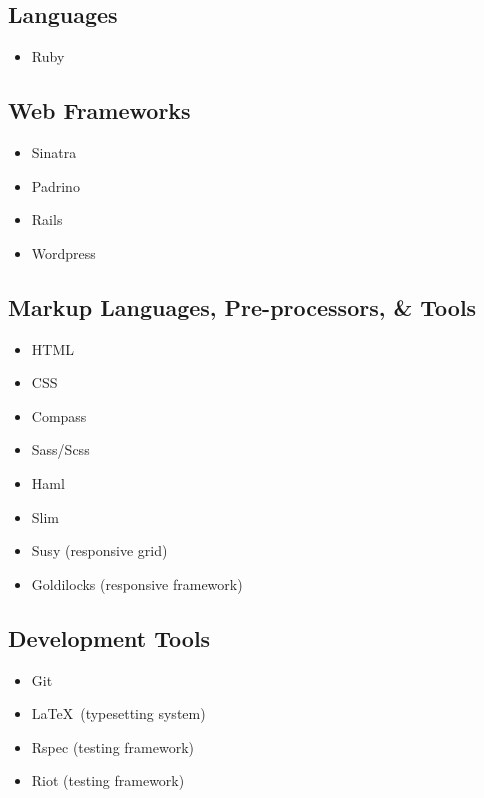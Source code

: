 \documentclass{article}
\begin{document}
\begin{multicols}{2}
\subsection{Languages} %
\label{sub:Languages}

\begin{itemize}
  \item Ruby
\end{itemize}

\subsection{Web Frameworks} %
\label{sub:Web Frameworks}

\begin{itemize}
  \item Sinatra
  \item Padrino
  \item Rails
  \item Wordpress
\end{itemize}

\subsection{Markup Languages, Pre-processors, \& Tools} %
\label{sub:Markup Languages, Pre-processors, \& Tools}

\begin{itemize}
  \item HTML
  \item CSS
  \item Compass
  \item Sass/Scss
  \item Haml
  \item Slim
  \item Susy (responsive grid)
  \item Goldilocks (responsive framework)
\end{itemize}

\subsection{Development Tools} %
\label{sub:Development Tools}

\begin{itemize}
  \item Git
  \item \LaTeX\ (typesetting system)
  \item Rspec (testing framework)
  \item Riot (testing framework)
\end{itemize}

\end{multicols}
\end{document}
